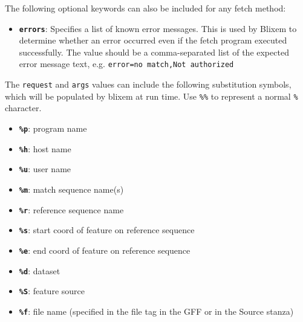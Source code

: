 \documentclass[letterpaper]{article}
\newcommand\textstyleSourceText[1]{\texttt{#1}}
\newcommand\liststyleLii{%
\renewcommand\labelitemi{{\textbullet}}
\renewcommand\labelitemii{{\textbullet}}
\renewcommand\labelitemiii{{\textbullet}}
\renewcommand\labelitemiv{{\textbullet}}
}
\begin{document}
\bigskip

{
The following optional keywords can also be included for any fetch
method: }

\liststyleLii
\begin{itemize}
\item {
\texttt{\textbf{errors}}: Specifies a list of known error messages. This
is used by Blixem to determine whether an error occurred even if the
fetch program executed successfully. The value should be a
comma-separated list of the expected error message text, e.g.
\textstyleSourceText{error={\textquotedbl}no
match{\textquotedbl},{\textquotedbl}Not
authorized{\textquotedbl}}\texttt{ }}
\end{itemize}

\bigskip

{
The \textstyleSourceText{request} and
\textstyleSourceText{\textrm{args}} values can include the following
substitution symbols, which will be populated by blixem at run time.
Use \texttt{\%\%} to represent a normal \texttt{\%} character. }

\liststyleLii
\begin{itemize}
\item {
\texttt{\textbf{\%p}}: program name }
\end{itemize}
\liststyleLii
\begin{itemize}
\item {
\texttt{\textbf{\%h}}: host name }
\item {
\texttt{\textbf{\%u}}: user name }
\item {
\texttt{\textbf{\%m}}: match sequence name(s) }
\item {
\texttt{\textbf{\%r}}: reference sequence name }
\item {
\texttt{\textbf{\%s}}: start coord of feature on reference sequence }
\item {
\texttt{\textbf{\%e}}: end coord of feature on reference sequence }
\item {
\texttt{\textbf{\%d}}: dataset }
\item {
\texttt{\textbf{\%S}}: feature source }
\item {
\texttt{\textbf{\%f}}: file name (specified in the file tag in the GFF
or in the Source stanza) }


\bigskip
\end{itemize}
\end{document}
